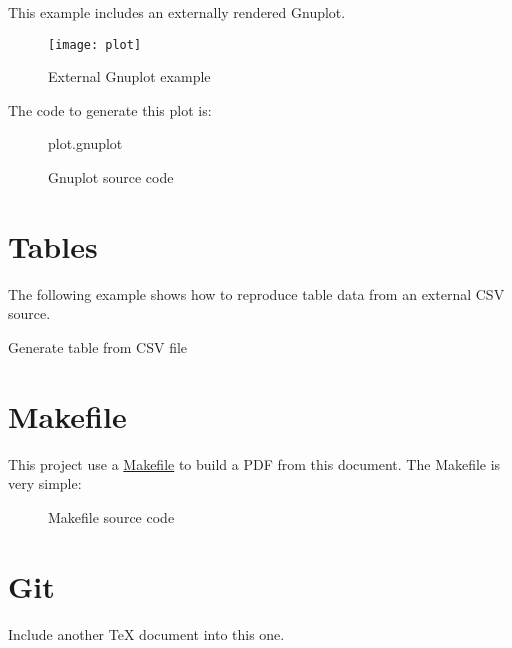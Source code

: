 \documentclass[10pt,a4paper]{article}
\begin{document}
This example includes an externally rendered Gnuplot.

\begin{figure}[h]
  \centering
  \texttt{[image: plot]}
  \caption{External Gnuplot example}
\end{figure}

The code to generate this plot is:
\begin{figure}[h]
  \begin{lstinputlisting}[language=Gnuplot]{plot.gnuplot}
  \end{lstinputlisting}
  \caption{Gnuplot source code}
\end{figure}

\sectionbreak{}

\section*{Tables}

The following example shows how to reproduce table data from an external CSV source.

\begin{table}[h]
\label{table1}
  \begin{center}
    \caption{Generate table from CSV file}
  \end{center}
\end{table}

\lipsum[3]

\sectionbreak{}

\section*{Makefile}

This project use a \href{https://www.gnu.org/software/make/}{Makefile} to build
a PDF from this document. The Makefile is very simple:

\begin{figure}[h]
  
  \caption{Makefile source code}
\end{figure}

\sectionbreak{}

\section*{Git}

Include another TeX document into this one.


\end{document}
